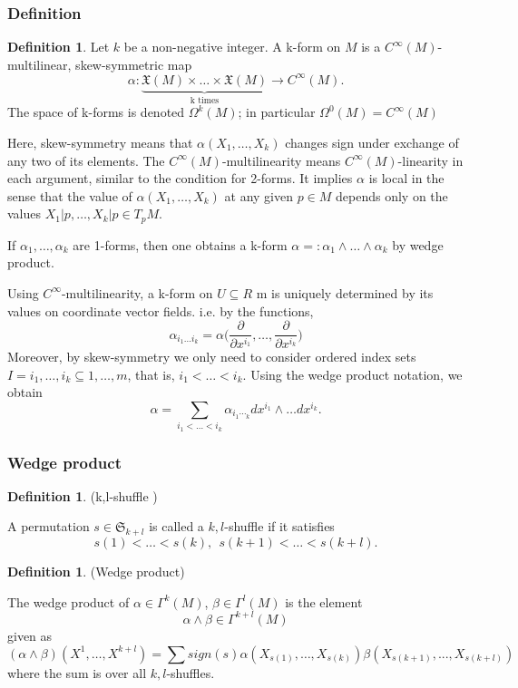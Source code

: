 \documentclass{article}
\theoremstyle{definition}
\newtheorem{defn}[theorem]{Definition}
\newenvironment{definition}
  {\vspace{8pt}\begin{mdframed}[backgroundcolor=blueish]\begin{defn}}
  {\end{defn}\end{mdframed}\vspace{4pt}}
\begin{document}
\subsubsection{Definition}
\begin{definition}
Let $k$ be a non-negative integer. A k-form on $M$ is a $C^\infty(M)$-multilinear, skew-symmetric map
\[
    \alpha : \underbrace{\mathfrak X(M) \times \dots \times \mathfrak X(M)}_\text{k times} \rightarrow C^\infty (M).
\]
The space of k-forms is denoted $\Omega^k (M)$; in particular $\Omega^0 (M) = C^\infty(M)$
\end{definition}

Here, skew-symmetry means that $\alpha(X_1,\dots, X_k)$ changes sign under exchange of any two of its elements.  The $C^\infty(M)$-multilinearity means $C^\infty(M)$-linearity in each argument, similar to the condition for 2-forms. It implies $\alpha$ is local in the sense that the value of $\alpha(X_1,\dots,X_k)$ at any given $p \in M$ depends only on the values $X_1|p,\dots,X_k |p \in T_pM$. 

If $\alpha_1,\dots,\alpha_k$ are 1-forms, then one obtains a k-form $\alpha =: \alpha_1\wedge\dots\wedge\alpha_k$ by wedge product.

Using $C^\infty$-multilinearity, a k-form on $U \subseteq R$ m is uniquely determined by its values on coordinate vector fields. i.e. by the functions,
\[
    \alpha_{i_1\dots i_k} = \alpha \bigg ( \frac{\partial}{\partial x^{i_1}}, \dots , \frac{\partial}{ \partial x ^{i_k}} \bigg )
\]
Moreover, by skew-symmetry we only need to consider ordered index sets $I = {i_1,\dots,i_k} \subseteq {1,\dots,m}$, that is, $i_1 < \dots < i_k$. Using the wedge product notation, we obtain
\[
\alpha = \sum_{i_1<\dots<i_k} \alpha_{i_1\dotsi_k} dx^{i_1} \wedge \dots dx^{i_k}.
\]

\subsubsection{Wedge product}

\begin{definition} (k,l-shuffle )

A permutation $s \in \mathfrak S_{k+l}$ is called a $k,l$-shuffle if it satisfies
\[
   s(1) < \dots < s(k), \ \ s(k +1) < \dots < s(k +l).
\]
\end{definition}

\begin{definition} (Wedge product)

The wedge product of $\alpha  \in  \Gamma^k (M)$, $\beta  \in  \Gamma^l (M)$ is the element
\[
    \alpha \wedge \beta \in  \Gamma^{k+l} (M)
\] 
given as
\[
    (\alpha \wedge\beta )(X^1,\dots ,X^{k+l}) = \sum sign(s) \alpha (X_{s(1)},\dots ,X_{s(k)}) \beta (X_{s(k+1)},...,X_{s(k+l)})
\]
where the sum is over all $k,l$-shuffles.
\end{definition}
\end{document}
